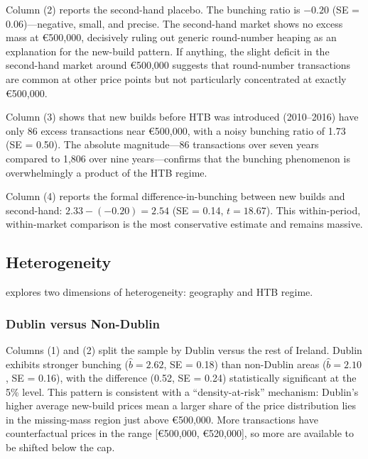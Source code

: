 \documentclass[12pt]{article}
\newcommand{\eur}[1]{\euro{}#1}
\begin{document}
Column (2) reports the second-hand placebo. The bunching ratio is $-0.20$ (SE = 0.06)---negative, small, and precise. The second-hand market shows no excess mass at \eur{500,000}, decisively ruling out generic round-number heaping as an explanation for the new-build pattern. If anything, the slight deficit in the second-hand market around \eur{500,000} suggests that round-number transactions are common at other price points but not particularly concentrated at exactly \eur{500,000}.

Column (3) shows that new builds before HTB was introduced (2010--2016) have only 86 excess transactions near \eur{500,000}, with a noisy bunching ratio of 1.73 (SE = 0.50). The absolute magnitude---86 transactions over seven years compared to 1,806 over nine years---confirms that the bunching phenomenon is overwhelmingly a product of the HTB regime.

Column (4) reports the formal difference-in-bunching between new builds and second-hand: $2.33 - (-0.20) = 2.54$ (SE = 0.14, $t = 18.67$). This within-period, within-market comparison is the most conservative estimate and remains massive.



\subsection{Heterogeneity}

 explores two dimensions of heterogeneity: geography and HTB regime.

\subsubsection*{Dublin versus Non-Dublin} Columns (1) and (2) split the sample by Dublin versus the rest of Ireland. Dublin exhibits stronger bunching ($\hat{b} = 2.62$, SE = 0.18) than non-Dublin areas ($\hat{b} = 2.10$, SE = 0.16), with the difference (0.52, SE = 0.24) statistically significant at the 5\% level. This pattern is consistent with a ``density-at-risk'' mechanism: Dublin's higher average new-build prices mean a larger share of the price distribution lies in the missing-mass region just above \eur{500,000}. More transactions have counterfactual prices in the range [\eur{500,000}, \eur{520,000}], so more are available to be shifted below the cap.
\end{document}
